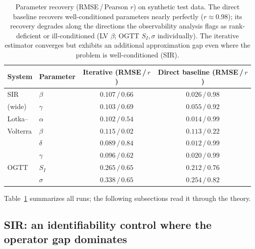 \begin{table}[t]
\centering
\caption{Parameter recovery (RMSE\,/\,Pearson $r$) on synthetic test data. The direct baseline
recovers well-conditioned parameters nearly perfectly ($r\!\approx\!0.98$); its recovery degrades along the
directions the observability analysis flags as rank-deficient or ill-conditioned (LV $\beta$; OGTT
$S_I,\sigma$ individually). The iterative estimator converges but exhibits an additional
approximation gap even where the problem is well-conditioned (SIR).}
\label{tab:recovery}
\begin{tabular}{llcc}
\hline
System & Parameter & Iterative (RMSE\,/\,$r$) & Direct baseline (RMSE\,/\,$r$) \\
\hline
SIR       & $\beta$   & $0.107\,/\,0.66$ & $\mathbf{0.026\,/\,0.98}$ \\
(wide)    & $\gamma$  & $0.103\,/\,0.69$ & $\mathbf{0.055\,/\,0.92}$ \\
\hline
Lotka--   & $\alpha$  & $0.102\,/\,0.54$ & $\mathbf{0.014\,/\,0.99}$ \\
Volterra  & $\beta$   & $0.115\,/\,0.02$ & $0.113\,/\,0.22$ \\
          & $\delta$  & $0.089\,/\,0.84$ & $\mathbf{0.012\,/\,0.99}$ \\
          & $\gamma$  & $0.096\,/\,0.62$ & $\mathbf{0.020\,/\,0.99}$ \\
\hline
OGTT      & $S_I$     & $0.265\,/\,0.65$ & $0.212\,/\,0.76$ \\
          & $\sigma$  & $0.338\,/\,0.65$ & $0.254\,/\,0.82$ \\
\hline
\end{tabular}
\end{table}

Table~\ref{tab:recovery} summarizes all runs; the following subsections read it through the theory.

\subsection{SIR: an identifiability control where the operator gap dominates}
\label{subsec:exp-sir}

